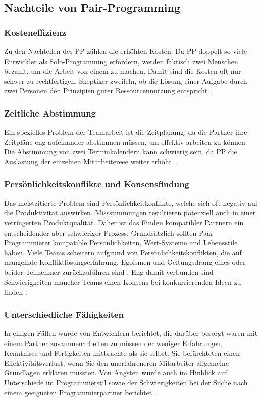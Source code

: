 \subsection{Nachteile von Pair-Programming}

\subsubsection {Kosteneffizienz} Zu den Nachteilen des PP zählen die erhöhten Kosten. Da PP doppelt so viele Entwickler als Solo-Programming erfordern, werden faktisch zwei Menschen bezahlt, um die Arbeit von einem zu machen. Damit sind die Kosten oft nur schwer zu rechtfertigen. Skeptiker zweifeln, ob die Lösung einer Aufgabe durch zwei Personen den Prinzipien guter Ressourcennutzung entspricht \cite{Begel2008PairMe}.

\subsubsection {Zeitliche Abstimmung} Ein spezielles Problem der Teamarbeit ist die Zeitplanung, da die Partner ihre Zeitpläne eng aufeinander abstimmen müssen, um effektiv arbeiten zu können. Die Abstimmung von zwei Terminkalendern kann schwierig sein, da PP die Auslastung der einzelnen Mitarbeitereee weiter erhöht \cite{Begel2008PairMe}.

\subsubsection {Persönlichkeitskonflikte und Konsensfindung} Das meistzitierte Problem sind Persönlichkeitkonflikte, welche sich oft negativ auf die Produktivität auswirken. Missstimmungen resultieren potenziell auch in einer verringerten Produktqualität. Daher ist das Finden kompatibler Partnern ein entscheidender aber schwieriger Prozess. Grundsätzlich sollten Paar-Programmierer kompatible Persönlichkeiten, Wert-Systeme und Lebensstile haben. Viele Teams scheitern aufgrund von Persönlichkeitskonflikten, die auf mangelnde Konfliktlösungserfahrung, Egoismen und Geltungsdrang eines oder beider Teilnehmer zurückzuführen sind \cite{Begel2008PairMe}. Eng damit verbunden sind Schwierigkeiten mancher Teams einen Konsens bei konkurrierenden Ideen zu finden \cite{Begel2008PairMe}.


\subsubsection{ Unterschiedliche Fähigkeiten} In einigen Fällen wurde von Entwicklern berichtet, die darüber besorgt waren mit einem Partner zusammenarbeiten zu müssen der weniger Erfahrungen, Kenntnisse und Fertigkeiten mitbrachte als sie selbst. Sie befürchteten einen Effektivitätsverlust, wenn Sie den unerfahreneren Mitarbeiter allgemeine Grundlagen erklären müssten. Von Ängsten wurde auch im Hinblick auf Unterschiede im Programmierstil sowie der Schwierigkeiten bei der Suche nach einem geeigneten Programmierpartner berichtet \cite{Begel2008PairMe,Cockburn2001TheProgramming,Williams2010PairProgramming}.


